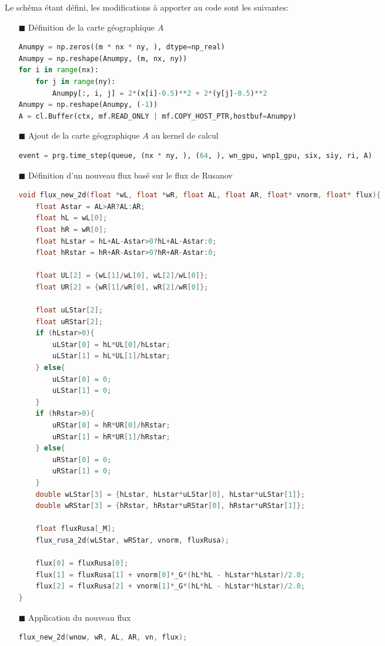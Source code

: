 \documentclass[
	french,
	11pt, %
]{fphw}
\begin{document}
Le schéma étant défini, les modifications à apporter au code sont les suivantes:
\begin{itemize}
	\item[$\blacksquare$] Définition de la carte géographique $A$
	\begin{lstlisting}[language=Python, caption={Défintion d'un fond en forme de cuve},breaklines]
Anumpy = np.zeros((m * nx * ny, ), dtype=np_real)
Anumpy = np.reshape(Anumpy, (m, nx, ny))
for i in range(nx):
	for j in range(ny):
		Anumpy[:, i, j] = 2*(x[i]-0.5)**2 + 2*(y[j]-0.5)**2
Anumpy = np.reshape(Anumpy, (-1))
A = cl.Buffer(ctx, mf.READ_ONLY | mf.COPY_HOST_PTR,hostbuf=Anumpy)
	\end{lstlisting}
	\item[$\blacksquare$] Ajout de la carte géographique $A$ au kernel de calcul
	\begin{lstlisting}[language=Python, caption={Ajout de la carte géographique au kernel de calcul},breaklines]
event = prg.time_step(queue, (nx * ny, ), (64, ), wn_gpu, wnp1_gpu, six, siy, ri, A)
	\end{lstlisting} 
	\item[$\blacksquare$] Définition d'un nouveau flux basé sur le flux de Rusanov
	\begin{lstlisting}[language=C, caption={Définition numérique du flux g},breaklines]
void flux_new_2d(float *wL, float *wR, float AL, float AR, float* vnorm, float* flux){
	float Astar = AL>AR?AL:AR;
	float hL = wL[0];
	float hR = wR[0];
	float hLstar = hL+AL-Astar>0?hL+AL-Astar:0;
	float hRstar = hR+AR-Astar>0?hR+AR-Astar:0;
	
	float UL[2] = {wL[1]/wL[0], wL[2]/wL[0]};
	float UR[2] = {wR[1]/wR[0], wR[2]/wR[0]};
	
	float uLStar[2];
	float uRStar[2];
	if (hLstar>0){
		uLStar[0] = hL*UL[0]/hLstar;
		uLStar[1] = hL*UL[1]/hLstar;
	} else{
		uLStar[0] = 0;
		uLStar[1] = 0;
	}
	if (hRstar>0){
		uRStar[0] = hR*UR[0]/hRstar;
		uRStar[1] = hR*UR[1]/hRstar;
	} else{
		uRStar[0] = 0;
		uRStar[1] = 0;
	}		
	double wLStar[3] = {hLstar, hLstar*uLStar[0], hLstar*uLStar[1]};
	double wRStar[3] = {hRstar, hRstar*uRStar[0], hRstar*uRStar[1]};

	float fluxRusa[_M];
	flux_rusa_2d(wLStar, wRStar, vnorm, fluxRusa);
	
	flux[0] = fluxRusa[0]; 
	flux[1] = fluxRusa[1] + vnorm[0]*_G*(hL*hL - hLstar*hLstar)/2.0; 
	flux[2] = fluxRusa[2] + vnorm[1]*_G*(hL*hL - hLstar*hLstar)/2.0; 
}		  
	\end{lstlisting}  
	\item[$\blacksquare$] Application du nouveau flux
	\begin{lstlisting}[language=C, caption={Application du nouveau flux},breaklines]
flux_new_2d(wnow, wR, AL, AR, vn, flux);  
	\end{lstlisting} 
\end{itemize}
\end{document}
